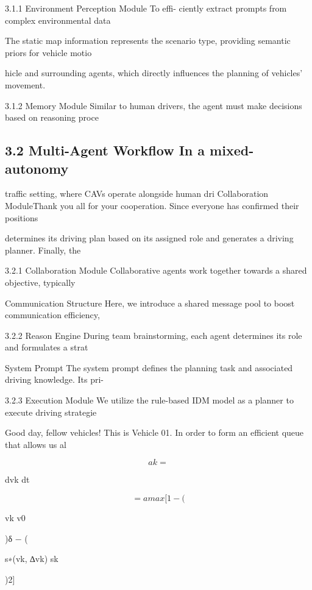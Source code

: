 \documentclass[12pt]{article}
\begin{document}
3.1.1 Environment Perception Module To effi-
ciently extract prompts from complex environmental
data


The static map information represents the scenario
type, providing semantic priors for vehicle motio


hicle and surrounding agents, which directly influences
the planning of vehicles’ movement.


3.1.2 Memory Module Similar to human drivers,
the agent must make decisions based on reasoning
proce


\subsection{3.2 Multi-Agent Workflow In a mixed-autonomy}

traffic setting, where CAVs operate alongside human
dri
Collaboration ModuleThank you all for your cooperation. Since everyone has confirmed their positions


determines its driving plan based on its assigned role
and generates a driving planner. Finally, the


3.2.1 Collaboration Module Collaborative agents
work together towards a shared objective, typically 


Communication Structure Here, we introduce a
shared message pool to boost communication efficiency,



3.2.2 Reason Engine During team brainstorming,
each agent determines its role and formulates a strat


System Prompt The system prompt defines the
planning task and associated driving knowledge. Its pri-


3.2.3 Execution Module We utilize the rule-based
IDM model as a planner to execute driving strategie


Good day, fellow vehicles! This is Vehicle 01. In order to form an efficient queue that allows us al


\begin{equation}
ak =
\end{equation}


dvk
dt


\begin{equation}
= amax[1 − (
\end{equation}


vk
v0


)δ − (


s∗(vk, ∆vk)
sk


)2]
\end{document}
